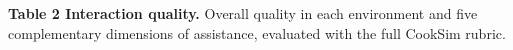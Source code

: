 \documentclass[10pt]{article}
\begin{document}
\newcommand{\ivgnotes}{}
\renewcommand{\ivgnote}[1]{\gdef\ivgnotes{#1}}

\par\vspace{6pt}
{\fontsize{8.8}{10.3}\selectfont\textsf{\textbf{Table 2 Interaction quality.}} Overall quality in each environment and five complementary dimensions of assistance, evaluated with the full CookSim rubric. \ivgnotes\par}
\end{document}
